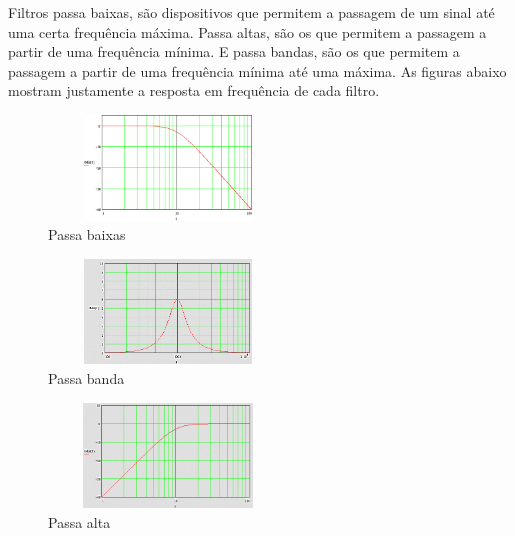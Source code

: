 \documentclass[conference]{IEEEtran}
\begin{document}
Filtros passa baixas, são dispositivos que permitem a passagem de um sinal até uma certa frequência máxima. Passa altas, são os que permitem a passagem a partir de uma frequência mínima. E passa bandas, são os que permitem a passagem a partir de uma frequência mínima até uma máxima. As figuras abaixo mostram justamente a resposta em frequência de cada filtro.


\begin{figure}[!h]
\centering
\includegraphics[width=2.5in, height=1.1in]{Imagens/baixass.eps}
\caption{Passa baixas} 
\label{baixa}
\end{figure}
\begin{figure}[!htb]
\centering
\includegraphics[width=2.5in, height=1.1in]{Imagens/BANDAA.png}
\caption{Passa banda}
\label{banda}
\end{figure}
\begin{figure}[!htb]
\centering
\includegraphics[width=2.5in, height=1.1in]{Imagens/ALTAA.png}
\caption{Passa alta} 
\label{alta}
\end{figure}






\end{document}
